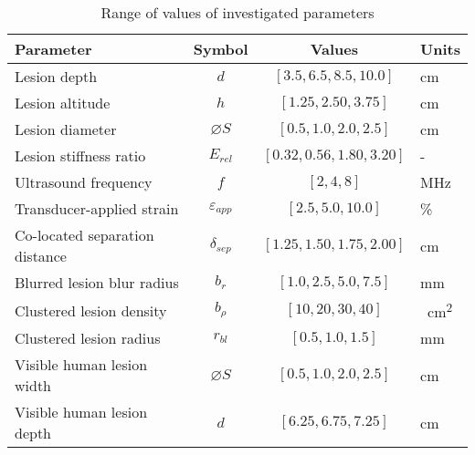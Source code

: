 \documentclass{article}
\begin{document}
		\begin{table}[!htb]
			\centering
			\caption[Quasi-static model investigated parameters]{Range of values of investigated parameters}
			\label{tab:quasi-parametervalues}
			\begin{tabular}{lccs[table-unit-alignment = left]}
				\toprule
				Parameter & Symbol & Values & Units \\
				\midrule
				Lesion depth & $d$ & $[3.5, 6.5, 8.5, 10.0]$ & \si{\cm} \\
				Lesion altitude & $h$ & $[1.25, 2.50, 3.75]$ & \si{\cm} \\
				Lesion diameter & $\diameter S$ & $[0.5, 1.0, 2.0, 2.5]$ & \si{\cm} \\
				Lesion stiffness ratio & $E_{rel}$ & $[0.32, 0.56, 1.80, 3.20]$ & - \\
				Ultrasound frequency & $f$ & $[2, 4, 8]$ & \si{\MHz} \\
				Transducer-applied strain & $\varepsilon_{app}$ & $[2.5, 5.0, 10.0]$ & \si{\percent} \\
				Co-located separation distance & $\delta_{sep}$ & $[1.25, 1.50, 1.75, 2.00]$ & \si{\cm} \\
				Blurred lesion blur radius & $b_r$ & $[1.0, 2.5, 5.0, 7.5]$ & \si{\mm} \\
				Clustered lesion density & $b_\rho$ & $[10, 20, 30, 40]$ & \si{\per\cm\squared} \\
				Clustered lesion radius & $r_{bl}$ & $[0.5, 1.0, 1.5]$ & \si{\mm} \\
				Visible human lesion width & $\diameter S$ & $[0.5, 1.0, 2.0, 2.5]$ & \si{\cm} \\
				Visible human lesion depth & $d$ & $[6.25, 6.75, 7.25]$ & \si{\cm} \\
				\bottomrule
			\end{tabular}
		\end{table}
\end{document}
